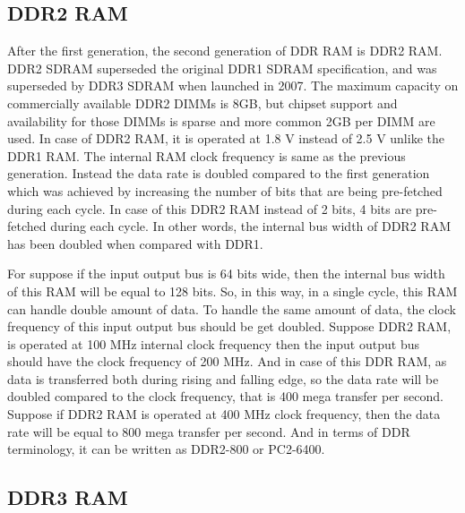 \subsection{DDR2 RAM}
After the first generation, the second generation of DDR RAM is DDR2 RAM. DDR2 SDRAM superseded the original DDR1 SDRAM specification, and was superseded by DDR3 SDRAM when launched in 2007. The maximum capacity on commercially available DDR2 DIMMs is 8GB, but chipset support and availability for those DIMMs is sparse and more common 2GB per DIMM are used. In case of DDR2 RAM, it is operated at 1.8 V instead of 2.5 V unlike the DDR1 RAM. The internal RAM clock frequency is same as the previous generation. Instead the data rate is doubled compared to the first generation which was achieved by increasing the number of bits that are being pre-fetched during each cycle. In case of this DDR2 RAM instead of 2 bits, 4 bits are pre-fetched during each cycle. In other words, the internal bus width of DDR2 RAM has been doubled when compared with DDR1.

\par For \eg suppose if the input output bus is 64 bits wide, then the internal bus width of this RAM will be equal to 128 bits. So, in this way, in a single cycle, this RAM can handle double amount of data. To handle the same amount of data, the clock frequency of this input output bus should be get doubled. Suppose DDR2 RAM, is operated at 100 MHz internal clock frequency then the input output bus should have the clock frequency of 200 MHz. And in case of this DDR RAM, as data is transferred both during rising and falling edge, so the data rate will be doubled compared to the clock frequency, that is 400 mega transfer per second. Suppose if DDR2 RAM is operated at 400 MHz clock frequency, then the data rate will be equal to 800 mega transfer per second. And in terms of DDR terminology, it can be written as DDR2-800 or PC2-6400.

\subsection{DDR3 RAM}

